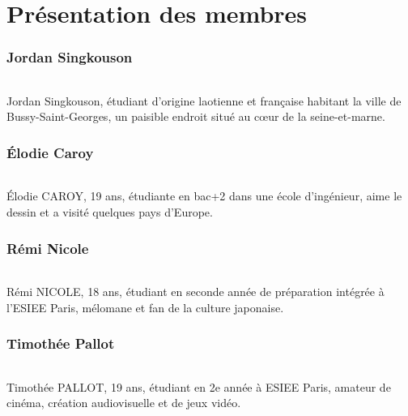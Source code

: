 \part{Présentation des membres}
\section{Jordan Singkouson}
\paragraph{}
Jordan Singkouson, étudiant d'origine laotienne et française habitant la ville de Bussy-Saint-Georges, un paisible endroit situé au cœur de la seine-et-marne. 

\section{Élodie Caroy}
\paragraph{}
Élodie CAROY, 19 ans, étudiante en bac+2 dans une école d'ingénieur, aime le dessin et a visité quelques pays d'Europe.

\section{Rémi Nicole}
\paragraph{}
Rémi NICOLE, 18 ans, étudiant en seconde année de préparation intégrée à l'ESIEE Paris, mélomane et fan de la culture japonaise.

\section{Timothée Pallot}
\paragraph{}
Timothée PALLOT, 19 ans, étudiant en 2e année à ESIEE Paris, amateur de cinéma, création audiovisuelle et de jeux vidéo.
